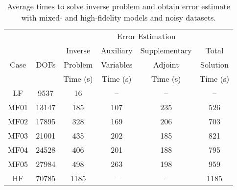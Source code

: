 %
\begin{table}
\caption{Average times to solve inverse problem and obtain error estimate with mixed- and high-fidelity models and noisy datasets.}
\label{tab:ref3D_newdata_times_diffmesh}
\centering
\begin{tabular}{ccc|c|c|c}
\cline{4-5} 
 & & & \multicolumn{2}{|c|}{Error Estimation} & \\
\cline{1-6}
\multicolumn{1}{|c|}{\multirow{3}{*}{Case}} & \multicolumn{1}{|c|}{\multirow{3}{*}{DOFs}} & Inverse & Auxiliary & Supplementary & \multicolumn{1}{|c|}{Total} \\
\multicolumn{1}{|c|}{} & \multicolumn{1}{|c|}{} & Problem & Variables & Adjoint & \multicolumn{1}{|c|}{Solution}\\
\multicolumn{1}{|c|}{} & \multicolumn{1}{|c|}{} & Time (s) &  Time (s) & Time (s) & \multicolumn{1}{|c|}{Time (s)}\\
\cline{1-6}
\multicolumn{1}{|c|}{LF}    & \multicolumn{1}{|c|}{9537}   & 16   & --  & -- & \multicolumn{1}{|c|}{--} \\ \hline
\multicolumn{1}{|c|}{MF01}  & \multicolumn{1}{|c|}{13147}  & 185  & 107 & 235 & \multicolumn{1}{|c|}{526} \\ \hline
\multicolumn{1}{|c|}{MF02}  & \multicolumn{1}{|c|}{17895}  & 328  & 169 & 206 & \multicolumn{1}{|c|}{703} \\ \hline
\multicolumn{1}{|c|}{MF03}  & \multicolumn{1}{|c|}{21001}  & 435  & 202 & 185 & \multicolumn{1}{|c|}{821} \\ \hline
\multicolumn{1}{|c|}{MF04}  & \multicolumn{1}{|c|}{24528}  & 406  & 201 & 188 & \multicolumn{1}{|c|}{795} \\ \hline
\multicolumn{1}{|c|}{MF05}  & \multicolumn{1}{|c|}{27984}  & 498  & 263 & 198 & \multicolumn{1}{|c|}{959} \\ \hline
\multicolumn{1}{|c|}{HF}    & \multicolumn{1}{|c|}{70785}  & 1185 & --  & --  & \multicolumn{1}{|c|}{1185} \\ \hline
\end{tabular}
\end{table}
%
